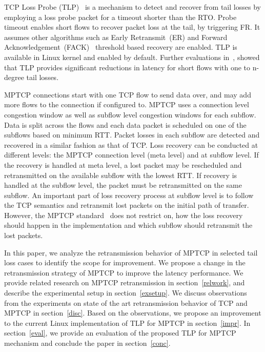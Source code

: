 \documentclass[10pt,conference,compsoc]{IEEEtran}
\begin{document}
TCP Loss Probe (TLP)~\cite{Flach:2013} is a mechanism to detect and recover from tail losses by employing a loss probe packet for a timeout shorter than the RTO. Probe timeout enables short flows to recover packet loss at the tail, by triggering FR. It assumes other algorithms such as Early Retransmit~(ER)\cite{rfc5827} and Forward Acknowledgement~(FACK)~\cite{FACK} threshold based recovery are enabled. TLP is available in Linux kernel and enabled by default. Further evaluations in~\cite{Rajiullah:2015}, showed that TLP provides significant reductions in latency for short flows with one to n-degree tail losses. 

 MPTCP connections start with one TCP flow to send data over, and may add more flows to the connection if configured to. MPTCP uses a connection level congestion window as well as subflow level congestion windows for each subflow. Data is split across the flows and each data packet is scheduled on one of the subflows based on minimum RTT. Packet losses in each subflow are detected and recovered in a similar fashion as that of TCP. Loss recovery can be conducted at different levels: the MPTCP connection level (meta level) and at subflow level. If the recovery is handled at meta level, a lost packet may be rescheduled and retransmitted on the available subflow with the lowest RTT. If recovery is handled at the subflow level, the packet must be retransmitted on the same subflow. An important part of loss recovery process at subflow level is to follow the TCP semantics and retransmit lost packets on the initial path of transfer. However, the MPTCP standard~\cite{rfc6824} does not restrict on, how the loss recovery should happen in the implementation and which subflow should retransmit the lost packets.


In this paper, we analyze the retransmission behavior of MPTCP in selected tail loss cases to identify the scope for improvement. We propose a change in the retransmission strategy of MPTCP to improve the latency performance. We provide related research on MPTCP retransmission in section~\ref{relwork}, and describe the experimental setup in section~\ref{exsetup}. We discuss observations from the experiments on state of the art retransmission behavior of TCP and MPTCP in section~\ref{disc}. Based on the observations, we propose an improvement to the current Linux implementation of TLP for MPTCP in section~\ref{impr}. In section~\ref{eval}, we provide an evaluation of the proposed TLP for MPTCP mechanism and conclude the paper in section~\ref{conc}.
 
\end{document}
